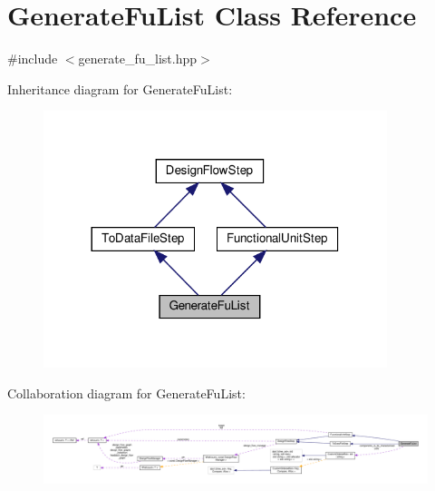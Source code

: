 \hypertarget{classGenerateFuList}{}\section{Generate\+Fu\+List Class Reference}
\label{classGenerateFuList}


{\ttfamily \#include $<$generate\+\_\+fu\+\_\+list.\+hpp$>$}



Inheritance diagram for Generate\+Fu\+List\+:
\nopagebreak
\begin{figure}[H]
\begin{center}
\leavevmode
\includegraphics[width=284pt]{d2/db6/classGenerateFuList__inherit__graph}
\end{center}
\end{figure}


Collaboration diagram for Generate\+Fu\+List\+:
\nopagebreak
\begin{figure}[H]
\begin{center}
\leavevmode
\includegraphics[width=350pt]{d7/d81/classGenerateFuList__coll__graph}
\end{center}
\end{figure}
